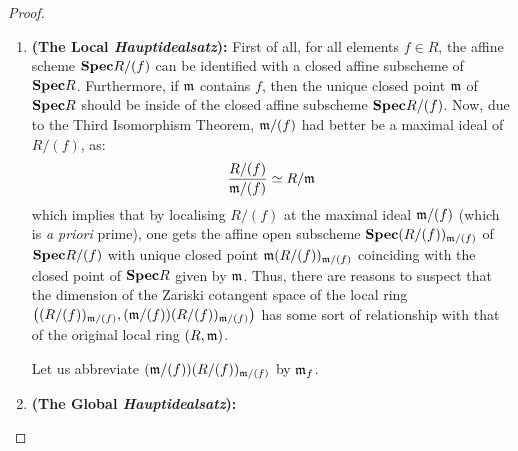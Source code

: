                 \begin{proof}
                    \noindent
                    \begin{enumerate}
                        \item \textbf{(The Local \textit{Hauptidealsatz}):} First of all, for all elements $f \in R$, the affine scheme $\mathbf{Spec} R/(f)$ can be identified with a closed affine subscheme of $\mathbf{Spec} R$. Furthermore, if $\mathfrak{m}$ contains $f$, then the unique closed point $\mathfrak{m}$ of $\mathbf{Spec} R$ should be inside of the closed affine subscheme $\mathbf{Spec} R/(f)$. Now, due to the Third Isomorphism Theorem, $\mathfrak{m}/(f)$ had better be a maximal ideal of $R/(f)$, as:
                            $$\frac{R/(f)}{\mathfrak{m}/(f)} \simeq R/\mathfrak{m}$$
                        which implies that by localising $R/(f)$ at the maximal ideal $\mathfrak{m}/(f)$ (which is \textit{a priori} prime), one gets the affine open subscheme $\mathbf{Spec} (R/(f))_{\mathfrak{m}/(f)}$ of $\mathbf{Spec} R/(f)$ with unique closed point $\mathfrak{m}(R/(f))_{\mathfrak{m}/(f)}$ coinciding with the closed point of $\mathbf{Spec} R$ given by $\mathfrak{m}$. Thus, there are reasons to suspect that the dimension of the Zariski cotangent space of the local ring $\left( (R/(f))_{\mathfrak{m}/(f)}, (\mathfrak{m}/(f))(R/(f))_{\mathfrak{m}/(f)}\right)$ has some sort of relationship with that of the original local ring $(R, \mathfrak{m})$.
                        
                        Let us abbreviate $(\mathfrak{m}/(f))(R/(f))_{\mathfrak{m}/(f)}$ by $\mathfrak{m}_f$. 
                        \item \textbf{(The Global \textit{Hauptidealsatz}):}
                    \end{enumerate}
                \end{proof}
            

